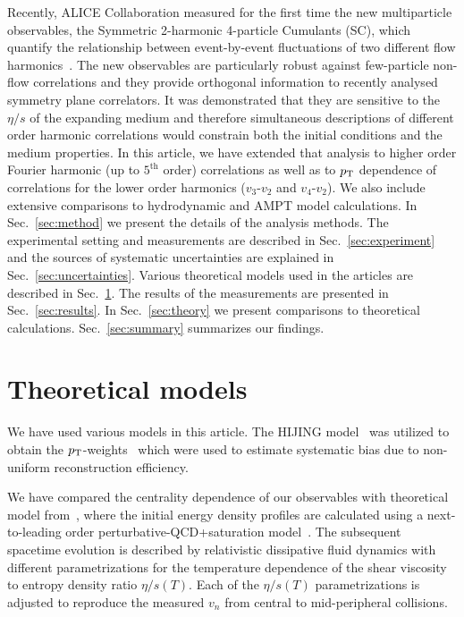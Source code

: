 \documentclass[ALICE,manyauthors]{cernphprep}
\begin{document}
Recently, ALICE Collaboration measured for the first time the new multiparticle observables, the Symmetric 2-harmonic 4-particle Cumulants (SC), which quantify the relationship between event-by-event fluctuations of two different flow harmonics~\cite{ALICE:2016kpq}. The new observables are particularly robust against few-particle non-flow correlations and they provide orthogonal information to recently analysed symmetry plane correlators. 
It was demonstrated that they are sensitive to the $\eta/s$ of the expanding medium and therefore simultaneous descriptions of different order harmonic correlations would constrain 
both the initial conditions and the medium properties.
In this article, we have extended that analysis to higher order Fourier harmonic (up to $5^{\mathrm{th}}$ order) correlations as well as to $p_{\rm T}$ dependence of correlations for the lower order harmonics ($v_3$-$v_2$ and $v_4$-$v_2$).  We also include extensive comparisons to hydrodynamic and AMPT model calculations.
In Sec.~\ref{sec:method} we present the details of the analysis methods. The experimental setting and measurements are described in Sec.~\ref{sec:experiment} and the sources of systematic uncertainties are explained in Sec.~\ref{sec:uncertainties}. Various theoretical models used in the articles are described in Sec.~\ref{sec:models}. The results of the measurements are presented in Sec.~\ref{sec:results}.
 In Sec.~\ref{sec:theory} we present comparisons to theoretical calculations. Sec.~\ref{sec:summary} summarizes our findings.
 
 
%




\section{Theoretical models}
\label{sec:models}
We have used various models in this article. The {HIJING} model~\cite{Wang:1991hta,Gyulassy:1994ew} was utilized to obtain the $p_{\rm T}$-weights~\cite{Bilandzic:2013kga} which were used to estimate systematic bias due to non-uniform reconstruction efficiency. 

We have compared the centrality dependence of our observables with theoretical model from~\cite{Niemi:2015qia}, where the initial energy density profiles are calculated using a next-to-leading order perturbative-QCD+saturation model~\cite{Paatelainen:2012at,Paatelainen:2013eea}. The subsequent spacetime evolution is described by relativistic dissipative fluid dynamics with different parametrizations for the temperature dependence of the shear viscosity to entropy density ratio $\eta/s(T)$. Each of the $\eta/s(T)$ parametrizations is adjusted to reproduce the measured $v_n$ from central to mid-peripheral collisions. 
\end{document}
